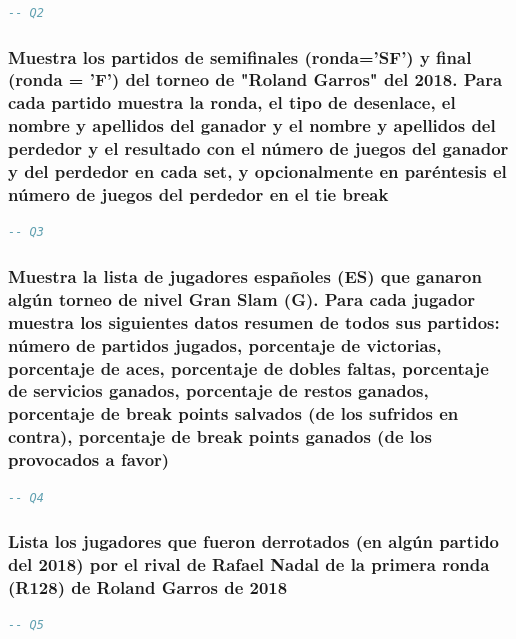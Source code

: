 \documentclass[10pt]{opticajnl}
\begin{document}
\begin{lstlisting}[language=SQL]
-- Q2
\end{lstlisting}





\subsubsection{Muestra los partidos de semiﬁnales (ronda='SF') y ﬁnal (ronda = 'F') del torneo de "Roland Garros" del 2018. Para cada partido muestra la ronda, el tipo de desenlace, el nombre y apellidos del ganador y el nombre y apellidos del perdedor y el resultado con el número de juegos del ganador y del perdedor en cada set, y opcionalmente en paréntesis el número de juegos del perdedor en el tie break}

\begin{lstlisting}[language=SQL]
-- Q3
\end{lstlisting}





\subsubsection{Muestra la lista de jugadores españoles (ES) que ganaron algún torneo de nivel Gran Slam (G). Para cada jugador muestra los siguientes datos resumen de todos sus partidos: número de partidos jugados, porcentaje de victorias, porcentaje de aces, porcentaje de dobles faltas, porcentaje de servicios ganados, porcentaje de restos ganados, porcentaje de break points salvados (de los sufridos en contra), porcentaje de break points ganados (de los provocados a favor)}

\begin{lstlisting}[language=SQL]
-- Q4
\end{lstlisting}





\subsubsection{Lista los jugadores que fueron derrotados (en algún partido del 2018) por el rival de Rafael Nadal de la primera ronda (R128) de Roland Garros de 2018}

\begin{lstlisting}[language=SQL]
-- Q5
\end{lstlisting}
\end{document}
